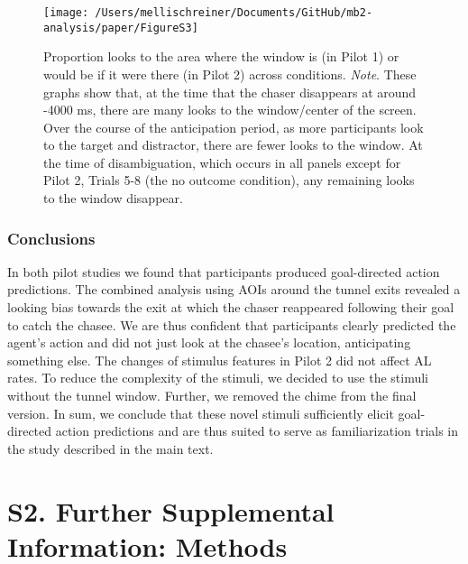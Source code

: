 \documentclass[
  man, donotrepeattitle,floatsintext]{apa6}
\begin{document}
\begin{figure}

\texttt{[image: /Users/mellischreiner/Documents/GitHub/mb2-analysis/paper/FigureS3]} \hfill{}

\caption{Proportion looks to the area where the window is (in Pilot 1) or would be if it were there (in Pilot 2) across conditions. \newline{} \textit{Note}. These graphs show that, at the time that the chaser disappears at around -4000 ms, there are many looks to the window/center of the screen. Over the course of the anticipation period, as more participants look to the target and distractor, there are fewer looks to the window. At the time of disambiguation, which occurs in all panels except for Pilot 2, Trials 5-8 (the no outcome condition), any remaining looks to the window disappear.}\label{fig:figS3}
\end{figure}

\subsubsection{Conclusions}\label{conclusions}

In both pilot studies we found that participants produced goal-directed action predictions. The combined analysis using AOIs around the tunnel exits revealed a looking bias towards the exit at which the chaser reappeared following their goal to catch the chasee. We are thus confident that participants clearly predicted the agent's action and did not just look at the chasee's location, anticipating something else. The changes of stimulus features in Pilot 2 did not affect AL rates. To reduce the complexity of the stimuli, we decided to use the stimuli without the tunnel window. Further, we removed the chime from the final version. In sum, we conclude that these novel stimuli sufficiently elicit goal-directed action predictions and are thus suited to serve as familiarization trials in the study described in the main text.

\section{S2. Further Supplemental Information: Methods}\label{s2.-further-supplemental-information-methods}
\end{document}

